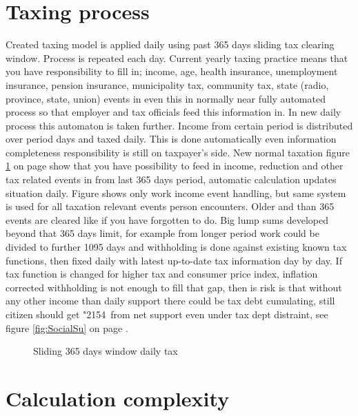 \section{Taxing process}
\label{tax_process}
Created taxing model is applied daily using past 365 days sliding tax clearing window.
Process is repeated each day.
Current yearly taxing practice means that you have responsibility to fill in;
income, age, health insurance, unemployment insurance, pension insurance,
municipality tax, community tax, state (radio, province, state, union) events
in even this in normally near fully automated process so that employer
and tax officials feed this information in.
In new daily process this automaton is taken further.
Income from certain period is distributed over period days and taxed daily.
This is done automatically even information completeness responsibility is still on taxpayer's side.
New normal taxation figure \ref{fig:taxing} on page \pageref{fig:taxing}
show that you have possibility to feed in income, reduction
and other tax related events in from last 365 days period,
automatic calculation updates situation daily.
Figure shows only work income event handling,
but same system is used for all taxation relevant events person encounters.
Older and than 365 events are cleared like if you have forgotten to do.
Big lump sums developed beyond that 365 days limit,
for example from longer period work could be divided to further 1095 days
and withholding is done against existing known tax functions,
then fixed daily with latest up-to-date tax information day by day.
If tax function is changed for higher tax and consumer price index,
inflation corrected withholding is not enough to fill that gap,
then is risk is that without any other income than daily support there could be tax debt cumulating,
still citizen should get \char"2154~from net support even under tax dept distraint,
see figure \ref{fig:SocialSu} on page \pageref{fig:SocialSu}.
\begin{figure} %
 \begin{center}
  \caption{Sliding 365 days window daily tax}
  \label{fig:taxing} 
 \end{center}
\end{figure}

\section{Calculation complexity}
\label{calculation_complexity}

